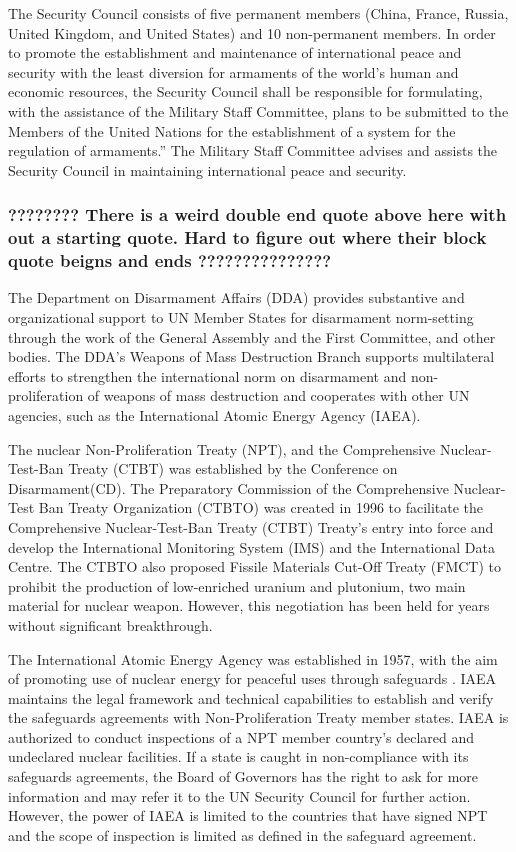 \documentclass{report}
\begin{document}
The Security Council consists of five permanent members (China, France, Russia, United Kingdom, and United States) and 10 non-permanent members. In order to promote the establishment and maintenance of international peace and security with the least diversion for armaments of the world's human and economic resources, the Security Council shall be responsible for formulating, with the assistance of the Military Staff Committee, plans to be submitted to the Members of the United Nations for the establishment of a system for the regulation of armaments.” The Military Staff Committee advises and assists the Security Council in maintaining international peace and security.

\subsubsection{????????   There is a weird double end quote above here with out a starting quote. Hard to figure out where their block quote beigns and ends ??????????????? }


The Department on Disarmament Affairs (DDA) provides substantive and organizational support to UN Member States for disarmament norm-setting through the work of the General Assembly and the First Committee, and other bodies. The DDA’s Weapons of Mass Destruction Branch supports multilateral efforts to strengthen the international norm on disarmament and non-proliferation of weapons of mass destruction and cooperates with other UN agencies, such as the International Atomic Energy Agency (IAEA).


The nuclear Non-Proliferation Treaty (NPT), and the Comprehensive Nuclear-Test-Ban Treaty (CTBT) was established by the Conference on Disarmament(CD). The Preparatory Commission of the Comprehensive Nuclear-Test Ban Treaty Organization (CTBTO) \cite{Affairs2008} was created in 1996 to facilitate the Comprehensive Nuclear-Test-Ban Treaty (CTBT) Treaty’s entry into force and develop the International Monitoring System (IMS) and the International Data Centre. The CTBTO also proposed Fissile Materials Cut-Off Treaty (FMCT) to prohibit the production of low-enriched uranium and plutonium, two main material for nuclear weapon. However, this negotiation has been held for years without significant breakthrough.


The International Atomic Energy Agency was established in 1957, with the aim of promoting use of nuclear energy for peaceful uses through safeguards \cite{InternationalAtomicEnergyAgency}.  IAEA maintains the legal framework and technical capabilities to establish and verify the safeguards agreements with Non-Proliferation Treaty member states. IAEA is authorized to conduct inspections of a NPT member country’s declared and undeclared nuclear facilities.  If a state is caught in non-compliance with its safeguards agreements, the Board of Governors has the right to ask for more information and may refer it to the UN Security Council for further action. However, the power of IAEA is limited to the countries that have signed NPT and the scope of inspection is limited as defined in the safeguard agreement. 
\end{document}
